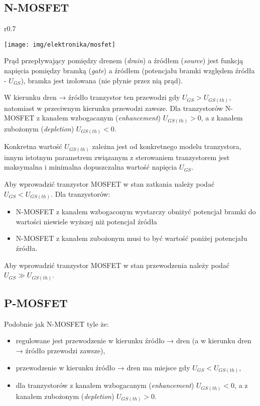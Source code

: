 \subsection{N-MOSFET}

\begin{wrapfigure}{r}{0.7\textwidth}
  \begin{center}
    \vspace{-40pt}
    \texttt{[image: img/elektronika/mosfet]}
    \vspace{-20pt}
  \end{center}
\end{wrapfigure}

Prąd przepływający pomiędzy drenem (\emph{drain}) a źródłem (\emph{source}) jest funkcją napięcia pomiędzy bramką (\emph{gate}) a źródłem (potencjału bramki względem źródła - $U_{GS}$), bramka jest izolowana (nie płynie przez nią prąd).

W kierunku dren → źródło tranzystor ten przewodzi gdy $U_{GS} > U_{GS (th)}$, natomiast w przeciwnym kierunku przewodzi zawsze. Dla tranzystorów N-MOSFET z kanałem wzbogacanym (\emph{enhancement}) $U_{GS (th)} > 0$, a z kanałem zubożonym (\emph{depletion}) $U_{GS (th)} < 0$.

Konkretna wartość $U_{GS (th)}$ zależna jest od konkretnego modelu tranzystora, innym istotnym parametrem związanym z sterowaniem tranzystorem jest maksymalna i minimalna dopuszczalna wartość napięcia $U_{GS}$.

Aby wprowadzić tranzystor MOSFET w stan zatkania należy podać $U_{GS} < U_{GS (th)}$. Dla tranzystorów:
\begin{itemize}
\item N-MOSFET z kanałem wzbogaconym wystarczy obniżyć potencjał bramki do wartości niewiele wyższej niż potencjał źródła
\item N-MOSFET z kanałem zubożonym musi to być wartość poniżej potencjału źródła.
\end{itemize}
Aby wprowadzić tranzystor MOSFET w stan przewodzenia należy podać $U_{GS} \gg U_{GS (th)}$.

\subsection{P-MOSFET}
Podobnie jak N-MOSFET tyle że:
\begin{itemize}
\item regulowane jest przewodzenie w kierunku źródło → dren (a w kierunku dren → źródło przewodzi zawsze),
\item przewodzenie w kierunku źródło → dren ma miejsce gdy $U_{GS} < U_{GS (th)}$,
\item dla tranzystorów z kanałem wzbogacanym (\emph{enhancement}) $U_{GS (th)} < 0$, a z kanałem zubożonym (\emph{depletion}) $U_{GS (th)} > 0$.
\end{itemize}

